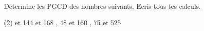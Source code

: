 %
%
Détermine les PGCD des nombres suivants. Ecris tous tes calculs.
    \begin{tasks}(2)
         et 144
         et 168
        , 48 et 160
        , 75 et 525
    \end{tasks}
